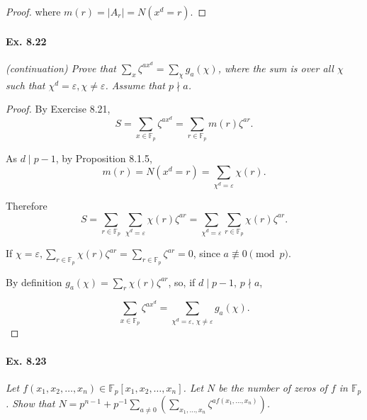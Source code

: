 \documentclass[11pt,a4paper]{article}
\newcommand{\F}{\mathbb{F}}
\begin{document}
{\begin{proof}
where $m(r) = \vert A_r\vert = N(x^d=r)$.
\end{proof}

\paragraph{Ex. 8.22} 
{\it  (continuation) Prove that $\sum_x \zeta^{ax^d} = \sum_\chi g_a(\chi)$, where the sum is over all $\chi$ such that $\chi^d=\varepsilon, \chi \ne \varepsilon$. Assume that $p \nmid a$.
}

\begin{proof}
By Exercise 8.21,
$$S = \sum_{x \in \F_p} \zeta^{ax^d} = \sum_{ r \in \F_p} m(r) \zeta^{ar}.$$

As  $d \mid p-1$, by Proposition 8.1.5,
$$m(r) = N(x^d=r) = \sum_{\chi^d = \varepsilon} \chi(r).$$

Therefore
 $$S = \sum_{r\in \F_p}\, \sum_{\chi^d = \varepsilon} \chi(r) \zeta^{ar} =\sum_{\chi^d = \varepsilon} \sum_{r\in \F_p} \chi(r) \zeta^{ar}.$$

If $\chi = \varepsilon, \sum\limits_{r\in \F_p} \chi(r) \zeta^{ar} = \sum\limits_{r\in \F_p} \zeta^{ar} = 0$, since $a\not \equiv 0 \pmod p$.

By definition $g_a(\chi) =  \sum_r \chi(r) \zeta^{ar}$, so, if $d \mid p-1$, $p \nmid a$,

$$\sum_{x\in \mathbb{F}_p} \zeta^{a x^d} = \sum_{\chi^d=\varepsilon,\, \chi\neq \varepsilon} g_a(\chi).$$
\end{proof}

\paragraph{Ex. 8.23}

{\it Let $f(x_1,x_2,\ldots,x_n) \in \F_p[x_1,x_2,\ldots,x_n]$. Let $N$ be the number of zeros of $f$ in $\F_p$. Show that $N = p^{n-1} + p^{-1} \sum_{a\neq 0} (\sum_{x_1,\ldots,x_n } \zeta^{af(x_1,\ldots,x_n)})$.
}

}
\end{document}

